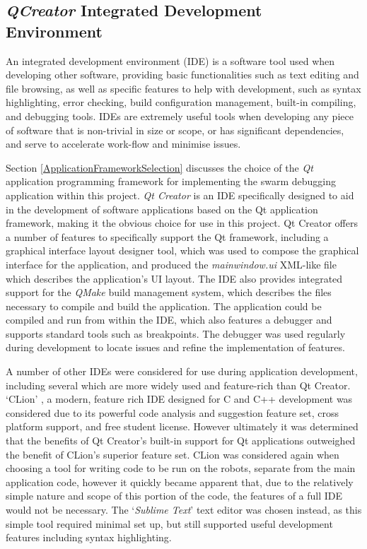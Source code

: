 \subsection{\textit{QCreator} Integrated Development Environment}
An integrated development environment (IDE) is a software tool used when developing other software, providing basic functionalities such as text editing and file browsing, as well as specific features to help with development, such as syntax highlighting, error checking, build configuration management, built-in compiling, and debugging tools. IDEs are extremely useful tools when developing any piece of software that is non-trivial in size or scope, or has significant dependencies, and serve to accelerate work-flow and minimise issues.

Section \ref{ApplicationFrameworkSelection} discusses the choice of the \textit{Qt} application programming framework for implementing the swarm debugging application within this project. \textit{Qt Creator} \cite{QTCreator} is an IDE specifically designed to aid in the development of software applications based on the Qt application framework, making it the obvious choice for use in this project. Qt Creator offers a number of features to specifically support the Qt framework, including a graphical interface layout designer tool, which was used to compose the graphical interface for the application, and produced the \textit{mainwindow.ui} XML-like file which describes the application's UI layout. The IDE also provides integrated support for the \textit{QMake} build management system, which describes the files necessary to compile and build the application. The application could be compiled and run from within the IDE, which also features a debugger and supports standard tools such as breakpoints. The debugger was used regularly during development to locate issues and refine the implementation of features.

A number of other IDEs were considered for use during application development, including several which are more widely used and feature-rich than Qt Creator. `CLion' \cite{CLion}, a modern, feature rich IDE designed for C and C++ development was considered due to its powerful code analysis and suggestion feature set, cross platform support, and free student license. However ultimately it was determined that the benefits of Qt Creator's built-in support for Qt applications outweighed the benefit of CLion's superior feature set. CLion was considered again when choosing a tool for writing code to be run on the robots, separate from the main application code, however it quickly became apparent that, due to the relatively simple nature and scope of this portion of the code, the features of a full IDE would not be necessary. The `\textit{Sublime Text}' text editor \cite{SublimeText} was chosen instead, as this simple tool required minimal set up, but still supported useful development features including syntax highlighting.

